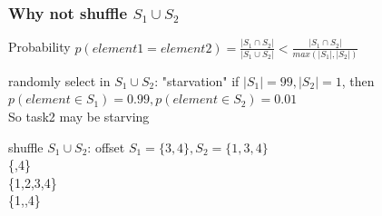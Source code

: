 \documentclass[notheorems, aspectratio=54]{beamer}
\begin{document}
\begin{frame}
    \frametitle{Why not shuffle $S_1 \cup S_2$}
    \begin{block} {Probability}
        $p(element1=element2) = \frac{|S_1\cap S_2|}{|S_1 \cup S_2|} < \frac{|S_1\cap S_2|}{max(|S_1|,|S_2|)}$
    \end{block}
    \begin{block} {randomly select in $S_1\cup S_2$: "starvation"}
        if $|S_1| = 99, |S_2| = 1$,
        then $p(element \in S_1) = 0.99, p(element \in S_2) = 0.01$ \\
        So task2 may be starving
    \end{block}
    \begin{block} {shuffle $S_1\cup S_2$: offset}
        $S_1 = \{3,4\}, S_2 = \{1,3,4\}$\\
        \{\space \space \space {},4\}\\
        \{1,2,3,4\} \\
        \{1,\space {},4\}\\
    \end{block}
\end{frame}


\end{document}
